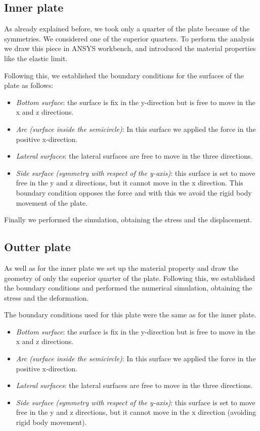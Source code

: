 \documentclass[a4paper 12pt]{article}
\begin{document}
\subsection{Inner plate}

As already explained before, we took only a quarter of the plate because of the symmetries. We considered one of the superior quarters. To perform the analysis we draw this piece in ANSYS workbench, and introduced the material properties like the elastic limit. 

Following this, we established the boundary conditions for the surfaces of the plate as follows:

\begin{itemize}
  \item \textit{Bottom surface}: the surface is fix in the y-direction but is free to move in the x and z directions.
  \item \textit{Arc (surface inside the semicircle)}: In this surface we applied the force in the positive x-direction.
  \item \textit{Lateral surfaces}: the lateral surfaces are free to move in the three directions.
  \item \textit{Side surface (symmetry with respect of the y-axis)}: this surface is set to move free in the y and z directions, but it cannot move in the x direction. This boundary condition opposes the force and with this we avoid the rigid body movement of the plate.
  
\end{itemize}

Finally we performed the simulation, obtaining the stress and the displacement.

\subsection{Outter plate}

As well as for the inner plate we set up the material property and draw the geometry of only the superior quarter of the plate. Following this, we established the boundary conditions and performed the numerical simulation, obtaining the stress and the deformation. 

The boundary conditions used for this plate were the same as for the inner plate. 

\begin{itemize}
  \item \textit{Bottom surface}: the surface is fix in the y-direction but is free to move in the x and z directions.
  \item \textit{Arc (surface inside the semicircle)}: In this surface we applied the force in the positive x-direction.
  \item \textit{Lateral surfaces}: the lateral surfaces are free to move in the three directions.
  \item \textit{Side surface (symmetry with respect of the y-axis)}: this surface is set to move free in the y and z directions, but it cannot move in the x direction (avoiding rigid body movement).
  
\end{itemize}
\end{document}
